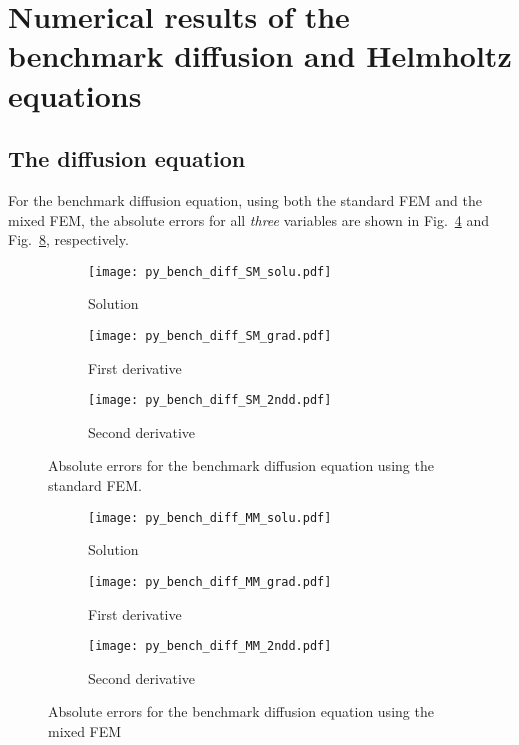 \documentclass[review,3p]{elsarticle}
\begin{document}
\newpage

\section{Numerical results of the benchmark diffusion and Helmholtz equations}         \label{discretization_error_bench_diff_Helm}

\subsection{The diffusion equation}         \label{discretization_error_bench_diff}

For the benchmark diffusion equation, using both the standard FEM and the mixed FEM, the absolute errors for all \emph{three} variables are shown in Fig.~\ref{py_bench_diff_SM} and  Fig.~\ref{py_bench_diff_MM}, respectively. 

\begin{figure}[!ht]
    \begin{subfigure}{5.5cm}
        \texttt{[image: py\_bench\_diff\_SM\_solu.pdf]}
        \caption{Solution}
        \label{py_bench_diff_SM_solu}
    \end{subfigure}
    \hspace{-0.2cm}
    \begin{subfigure}{5.5cm}
        \texttt{[image: py\_bench\_diff\_SM\_grad.pdf]}
        \caption{First derivative}
        \label{py_bench_diff_SM_grad}
    \end{subfigure}
    \hspace{-0.2cm}
    \begin{subfigure}{5.5cm}
        \texttt{[image: py\_bench\_diff\_SM\_2ndd.pdf]}
        \caption{Second derivative}
        \label{py_bench_diff_SM_2ndd}
    \end{subfigure}
\caption{Absolute errors for the benchmark diffusion equation using the standard FEM.}
\label{py_bench_diff_SM}
\end{figure}


\begin{figure}[!ht]
    \begin{subfigure}{5.5cm}
        \texttt{[image: py\_bench\_diff\_MM\_solu.pdf]}
        \caption{Solution}
        \label{py_bench_diff_MM_solu}
    \end{subfigure}
    \hspace{-0.2cm}
    \begin{subfigure}{5.5cm}
        \texttt{[image: py\_bench\_diff\_MM\_grad.pdf]}
        \caption{First derivative}
        \label{py_bench_diff_MM_grad}
    \end{subfigure}
    \hspace{-0.2cm}
    \begin{subfigure}{5.5cm}
        \texttt{[image: py\_bench\_diff\_MM\_2ndd.pdf]}
        \caption{Second derivative}
        \label{py_bench_diff_MM_2ndd}
    \end{subfigure}
\caption{Absolute errors for the benchmark diffusion equation using the mixed FEM}
\label{py_bench_diff_MM}    
\end{figure}
\end{document}
